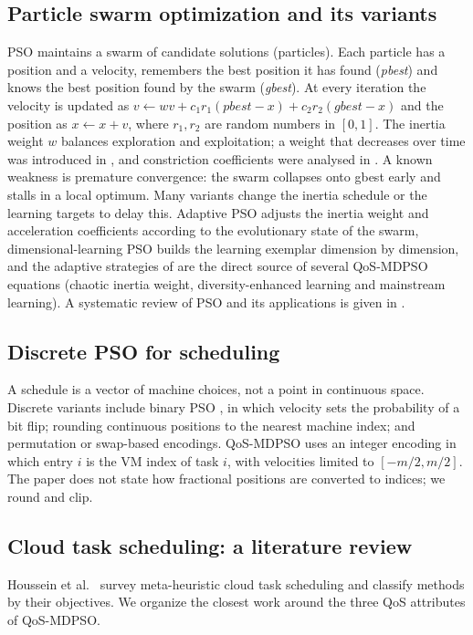 \documentclass[pdflatex,sn-basic]{sn-jnl}
\theoremstyle{thmstyleone}%
\theoremstyle{thmstyletwo}%
\theoremstyle{thmstylethree}%
\begin{document}
\subsection{Particle swarm optimization and its variants}\label{sec2.2}
PSO \citep{kennedy1995} maintains a swarm of candidate solutions (particles). Each particle has a position and a velocity, remembers the best position it has found (\emph{pbest}) and knows the best position found by the swarm (\emph{gbest}). At every iteration the velocity is updated as $v \leftarrow w v + c_1 r_1(\mathit{pbest}-x) + c_2 r_2(\mathit{gbest}-x)$ and the position as $x \leftarrow x+v$, where $r_1,r_2$ are random numbers in $[0,1]$. The inertia weight $w$ balances exploration and exploitation; a weight that decreases over time was introduced in \citep{shi1998}, and constriction coefficients were analysed in \citep{clerc2002}. A known weakness is premature convergence: the swarm collapses onto gbest early and stalls in a local optimum. Many variants change the inertia schedule or the learning targets to delay this. Adaptive PSO \citep{zhan2009} adjusts the inertia weight and acceleration coefficients according to the evolutionary state of the swarm, dimensional-learning PSO \citep{xu2019} builds the learning exemplar dimension by dimension, and the adaptive strategies of \citep{liu2020} are the direct source of several QoS-MDPSO equations (chaotic inertia weight, diversity-enhanced learning and mainstream learning). A systematic review of PSO and its applications is given in \citep{gad2022}.

\subsection{Discrete PSO for scheduling}\label{sec2.3}
A schedule is a vector of machine choices, not a point in continuous space. Discrete variants include binary PSO \citep{kennedy1997}, in which velocity sets the probability of a bit flip; rounding continuous positions to the nearest machine index; and permutation or swap-based encodings. QoS-MDPSO uses an integer encoding in which entry $i$ is the VM index of task $i$, with velocities limited to $[-m/2,m/2]$. The paper does not state how fractional positions are converted to indices; we round and clip.

\subsection{Cloud task scheduling: a literature review}\label{sec2.4}
Houssein et al.\ \citeyearpar{houssein2021} survey meta-heuristic cloud task scheduling and classify methods by their objectives. We organize the closest work around the three QoS attributes of QoS-MDPSO.
\end{document}
